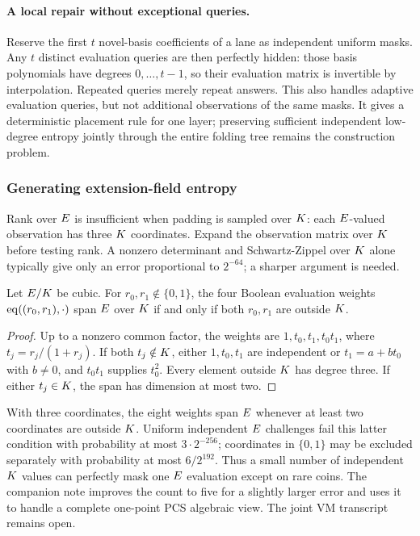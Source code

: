 \paragraph{A local repair without exceptional queries.} Reserve the first $t$ novel-basis coefficients of a lane as independent uniform masks. Any $t$ distinct evaluation queries are then perfectly hidden: those basis polynomials have degrees $0,\ldots,t-1$, so their evaluation matrix is invertible by interpolation. Repeated queries merely repeat answers. This also handles adaptive evaluation queries, but not additional observations of the same masks. It gives a deterministic placement rule for one layer; preserving sufficient independent low-degree entropy jointly through the entire folding tree remains the construction problem.

\subsubsection{Generating extension-field entropy}

Rank over $E$ is insufficient when padding is sampled over $K$: each $E$-valued observation has three $K$ coordinates. Expand the observation matrix over $K$ before testing rank. A nonzero determinant and Schwartz-Zippel over $K$ alone typically give only an error proportional to $2^{-64}$; a sharper argument is needed.

\begin{lemma}
Let $E/K$ be cubic. For $r_0,r_1\notin\{0,1\}$, the four Boolean evaluation weights $\operatorname{eq}((r_0,r_1),\cdot)$ span $E$ over $K$ if and only if both $r_0,r_1$ are outside $K$.
\end{lemma}

\begin{proof}
Up to a nonzero common factor, the weights are $1,t_0,t_1,t_0t_1$, where $t_j=r_j/(1+r_j)$. If both $t_j\notin K$, either $1,t_0,t_1$ are independent or $t_1=a+bt_0$ with $b\ne0$, and $t_0t_1$ supplies $t_0^2$. Every element outside $K$ has degree three. If either $t_j\in K$, the span has dimension at most two.
\end{proof}

With three coordinates, the eight weights span $E$ whenever at least two coordinates are outside $K$. Uniform independent $E$ challenges fail this latter condition with probability at most $3\cdot2^{-256}$; coordinates in $\{0,1\}$ may be excluded separately with probability at most $6/2^{192}$. Thus a small number of independent $K$ values can perfectly mask one $E$ evaluation except on rare coins. The companion note improves the count to five for a slightly larger error and uses it to handle a complete one-point PCS algebraic view. The joint VM transcript remains open.
